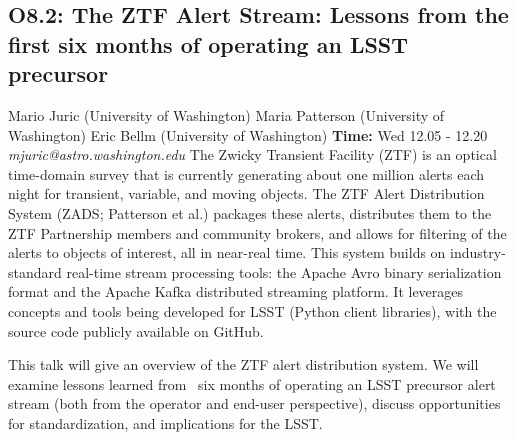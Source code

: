 \documentclass{report}
\begin{document}
\subsection*{O8.2: The ZTF Alert Stream: Lessons from the first six months of operating an LSST precursor}
\bigskip
Mario Juric (University of Washington) \newline Maria Patterson (University of Washington) \newline  Eric Bellm (University of Washington)\newline   \newline  \newline  \newline\newline
{\bf Time:} Wed 12.05 - 12.20\newline
\newline
{\it mjuric@astro.washington.edu}\newline
\newline\newline
The Zwicky Transient Facility (ZTF) is an optical time-domain survey that is currently generating about one million alerts each night for transient, variable, and moving objects. The ZTF Alert Distribution System (ZADS; Patterson et al.) packages these alerts, distributes them to the ZTF Partnership members and community brokers, and allows for filtering of the alerts to objects of interest, all in near-real time. This system builds on industry-standard real-time stream processing tools: the Apache Avro binary serialization format and the Apache Kafka distributed streaming platform. It leverages concepts and tools being developed for LSST (Python client libraries), with the source code publicly available on GitHub.

This talk will give an overview of the ZTF alert distribution system. We will examine lessons learned from ~six months of operating an LSST precursor alert stream (both from the operator and end-user perspective), discuss opportunities for standardization, and implications for the LSST.\newline
\newpage
\end{document}
